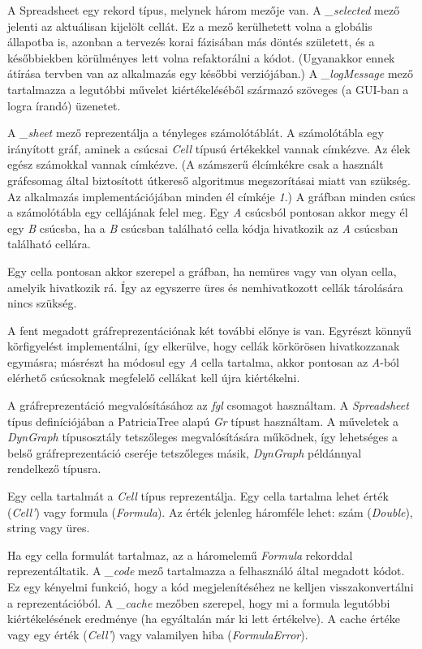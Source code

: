A Spreadsheet egy rekord típus, melynek három mezője van. A \textit{\_selected} mező jelenti az aktuálisan kijelölt cellát. Ez a mező kerülhetett volna a globális állapotba is, azonban a tervezés korai fázisában más döntés született, és a későbbiekben körülményes lett volna refaktorálni a kódot. (Ugyanakkor ennek átírása tervben van az alkalmazás egy későbbi verziójában.) A \textit{\_logMessage} mező tartalmazza a legutóbbi művelet kiértékeléséből származó szöveges (a GUI-ban a logra írandó) üzenetet.

A \textit{\_sheet} mező reprezentálja a tényleges számolótáblát. A számolótábla egy irányított gráf, aminek a csúcsai \textit{Cell} típusú értékekkel vannak címkézve. Az élek egész számokkal vannak címkézve. (A számszerű élcímkékre csak a használt gráfcsomag által biztosított útkereső algoritmus megszorításai miatt van szükség. Az alkalmazás implementációjában minden él címkéje \textit{1}.) A gráfban minden csúcs a számolótábla egy cellájának felel meg. Egy \textit{A} csúcsból pontosan akkor megy él egy \textit{B} csúcsba, ha a \textit{B} csúcsban található cella kódja hivatkozik az \textit{A} csúcsban található cellára. 

Egy cella pontosan akkor szerepel a gráfban, ha nemüres vagy van olyan cella, amelyik hivatkozik rá. Így az egyszerre üres és nemhivatkozott cellák tárolására nincs szükség.

A fent megadott gráfreprezentációnak két további előnye is van. Egyrészt könnyű körfigyelést implementálni, így elkerülve, hogy cellák körkörösen hivatkozzanak egymásra; másrészt ha módosul egy \textit{A} cella tartalma, akkor pontosan az \textit{A}-ból elérhető csúcsoknak megfelelő cellákat kell újra kiértékelni.

A gráfreprezentáció megvalósításához az \textit{fgl} csomagot használtam. A \textit{Spreadsheet} típus definíciójában a PatriciaTree alapú \textit{Gr} típust használtam. A műveletek a \textit{DynGraph} típusosztály tetszőleges megvalósítására működnek, így lehetséges a belső gráfreprezentáció cseréje tetszőleges másik, \textit{DynGraph} példánnyal rendelkező típusra.

Egy cella tartalmát a \textit{Cell} típus reprezentálja. Egy cella tartalma lehet érték (\textit{Cell'}) vagy formula (\textit{Formula}). Az érték jelenleg háromféle lehet: szám (\textit{Double}), string vagy üres.

Ha egy cella formulát tartalmaz, az a háromelemű \textit{Formula} rekorddal reprezentáltatik. A \textit{\_code} mező tartalmazza a felhasználó által megadott kódot. Ez egy kényelmi funkció, hogy a kód megjelenítéséhez ne kelljen visszakonvertálni a reprezentációból. A \textit{\_cache} mezőben szerepel, hogy mi a formula legutóbbi kiértékelésének eredménye (ha egyáltalán már ki lett értékelve). A cache értéke vagy egy érték (\textit{Cell'}) vagy valamilyen hiba (\textit{FormulaError}). 

